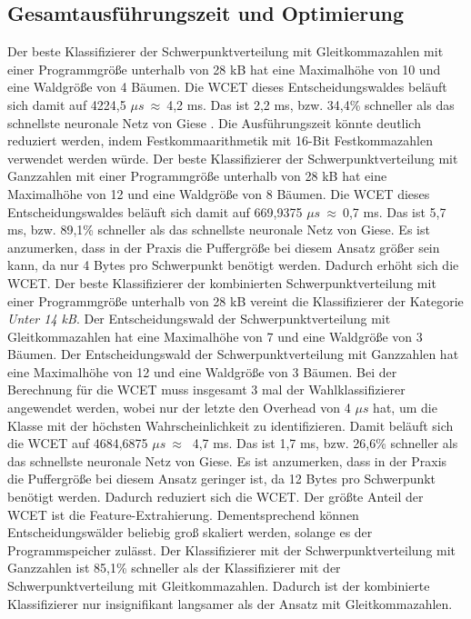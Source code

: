\subsection{Gesamtausführungszeit und Optimierung}
Der beste Klassifizierer der Schwerpunktverteilung mit Gleitkommazahlen mit einer Programmgröße unterhalb von 28 kB hat eine Maximalhöhe von 10 und eine Waldgröße von 4 Bäumen. Die WCET dieses Entscheidungswaldes
beläuft sich damit auf 4224,5 $\mu s\ \approx\ $4,2 ms. Das ist 2,2 ms, bzw. 34,4\% schneller als das schnellste neuronale Netz von Giese \cite{gieseThesis}. Die Ausführungszeit könnte deutlich reduziert werden, indem
Festkommaarithmetik mit 16-Bit Festkommazahlen verwendet werden würde.
\newline
\newline
Der beste Klassifizierer der Schwerpunktverteilung mit Ganzzahlen mit einer Programmgröße unterhalb von 28 kB hat eine Maximalhöhe von 12 und eine Waldgröße von 8 Bäumen. Die WCET dieses Entscheidungswaldes
beläuft sich damit auf 669,9375 $\mu s\ \approx\ $0,7 ms. Das ist 5,7 ms, bzw. 89,1\% schneller als das schnellste neuronale Netz von Giese. Es ist anzumerken, dass in der Praxis die Puffergröße
bei diesem Ansatz größer sein kann, da nur 4 Bytes pro Schwerpunkt benötigt werden. Dadurch erhöht sich die WCET.
\newline
\newline
Der beste Klassifizierer der kombinierten Schwerpunktverteilung mit einer Programmgröße unterhalb von 28 kB vereint die Klassifizierer der Kategorie \textit{Unter 14 kB}. Der Entscheidungswald der Schwerpunktverteilung
mit Gleitkommazahlen hat eine Maximalhöhe von 7 und eine Waldgröße von 3 Bäumen. Der Entscheidungswald der Schwerpunktverteilung mit Ganzzahlen hat eine Maximalhöhe von 12 und eine Waldgröße von 3 Bäumen. Bei der
Berechnung für die WCET muss insgesamt 3 mal der Wahlklassifizierer angewendet werden, wobei nur der letzte den Overhead von 4 $\mu s$ hat, um die Klasse mit der höchsten Wahrscheinlichkeit zu identifizieren. Damit
beläuft sich die WCET auf 4684,6875 $\mu s\ \approx\ $ 4,7 ms. Das ist 1,7 ms, bzw. 26,6\% schneller als das schnellste neuronale Netz von Giese. Es ist anzumerken, dass in der Praxis die Puffergröße
bei diesem Ansatz geringer ist, da 12 Bytes pro Schwerpunkt benötigt werden. Dadurch reduziert sich die WCET.
\newline
\newline
Der größte Anteil der WCET ist die Feature-Extrahierung. Dementsprechend können Entscheidungswälder beliebig groß skaliert werden, solange es der Programmspeicher zulässt. Der Klassifizierer mit der Schwerpunktverteilung
mit Ganzzahlen ist 85,1\% schneller als der Klassifizierer mit der Schwerpunktverteilung mit Gleitkommazahlen. Dadurch ist der kombinierte Klassifizierer nur insignifikant langsamer als der Ansatz mit Gleitkommazahlen.